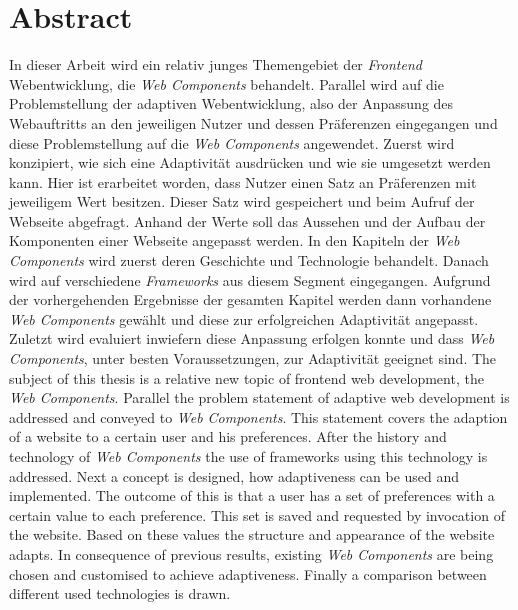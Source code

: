 \documentclass[12pt, paper=a4, bibtotoc, toc=listof, headsepline=true, numbers=endperiod]{scrreprt}
\newcommand{\listoflistings}{\listof{listing}{Listing Verzeichnis}}
\begin{document}









\chapter*{Abstract}
In dieser Arbeit wird ein relativ junges Themengebiet der \emph{Frontend} Webentwicklung, die \emph{Web Components} behandelt. Parallel wird auf die Problemstellung der adaptiven Webentwicklung, also der Anpassung des Webauftritts an den jeweiligen Nutzer und dessen Präferenzen eingegangen und diese Problemstellung auf die \emph{Web Components} angewendet. Zuerst wird konzipiert, wie sich eine Adaptivität ausdrücken und wie sie umgesetzt werden kann. Hier ist erarbeitet worden, dass Nutzer einen Satz an Präferenzen mit jeweiligem Wert besitzen. Dieser Satz wird gespeichert und beim Aufruf der Webseite abgefragt. Anhand der Werte soll das Aussehen und der Aufbau der Komponenten einer Webseite angepasst werden.
In den Kapiteln der \emph{Web Components} wird zuerst deren Geschichte und Technologie behandelt. Danach wird auf verschiedene \emph{Frameworks} aus diesem Segment eingegangen. Aufgrund der vorhergehenden Ergebnisse der gesamten Kapitel werden dann vorhandene \emph{Web Components} gewählt und diese zur erfolgreichen Adaptivität angepasst. Zuletzt wird evaluiert inwiefern diese Anpassung erfolgen konnte und dass \emph{Web Components}, unter besten Voraussetzungen, zur Adaptivität geeignet sind.     
\newline
\newline
The subject of this thesis is a relative new topic of frontend web development, the \emph{Web Components}. Parallel the problem statement of adaptive web development is addressed and conveyed to \emph{Web Components}. This statement covers the adaption of a website to a certain user and his preferences. After the history and technology of \emph{Web Components} the use of frameworks using this technology is addressed. Next a concept is designed, how adaptiveness can be used and implemented. The outcome of this is that a user has a set of preferences with a certain value to each preference. This set is saved and requested by invocation of the website. Based on these values the structure and appearance of the website adapts. In consequence of previous results, existing \emph{Web Components} are being chosen and customised to achieve adaptiveness. Finally a comparison between different used technologies is drawn.    
\listoflistings
\listoffigures
\end{document}
